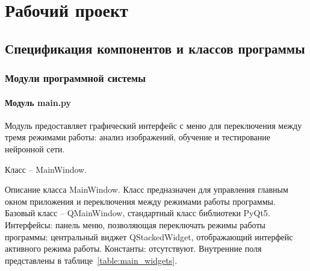 \section{Рабочий проект}

\subsection{Спецификация компонентов и классов программы}

\subsubsection{Модули программной системы}

\paragraph{Модуль main.py}

Модуль предоставляет графический интерфейс с меню для переключения между тремя режимами работы: анализ изображений, обучение и тестирование нейронной сети. 

Класс -- MainWindow.

Описание класса MainWindow.
Класс предназначен для управления главным окном приложения и переключения между режимами работы программы. Базовый класс -- QMainWindow, стандартный класс библиотеки PyQt5. Интерфейсы: панель меню, позволяющая переключать режимы работы программы; центральный виджет QStackedWidget, отображающий интерфейс активного режима работы. Константы: отсутствуют. Внутренние поля представлены в таблице~\ref{table:main_widgets}.

